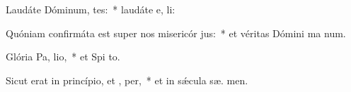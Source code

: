 \item Laudáte Dóminum,  tes:~* laudáte e,  li:
\item Quóniam confirmáta est super nos misericór jus:~* et véritas Dómini ma  num.
\item Glória Pa,  lio,~* et Spi to.
\item Sicut erat in princípio, et ,  per,~* et in sǽcula sæ. men.
